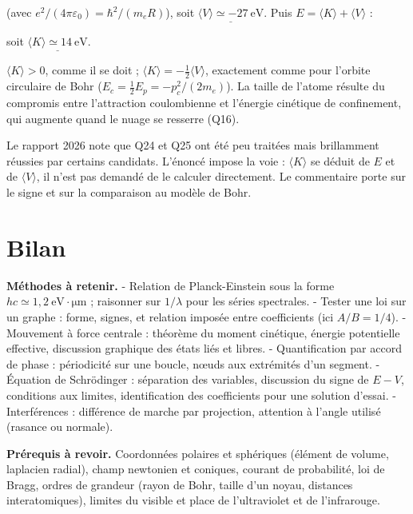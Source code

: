 \documentclass[11pt,a4paper]{article}
\newcommand{\equationajustee}[1]{%
  \sbox{\boiteequation}{$\displaystyle #1$}%
  \ifdim\wd\boiteequation>\linewidth
    \[\resizebox{\linewidth}{!}{\usebox{\boiteequation}}\]%
  \else
    \[#1\]%
  \fi}
\begin{document}
\equationajustee{\boxed{\langle V\rangle=-\frac{e^2}{4\pi\varepsilon_0R}=2E}}

(avec \(e^2/(4\pi\varepsilon_0)=\hbar^2/(m_eR)\)), soit \(\underline{\langle V\rangle\simeq-27\ \mathrm{eV}}\). Puis \(E=\langle K\rangle+\langle V\rangle\) :

\equationajustee{\boxed{\langle K\rangle=-E=E_0}}

soit \(\underline{\langle K\rangle\simeq14\ \mathrm{eV}}\).

\(\langle K\rangle>0\), comme il se doit ; \(\langle K\rangle=-\frac12\langle V\rangle\), exactement comme pour l'orbite circulaire de Bohr (\(E_c=\frac12E_p=-p_c^2/(2m_e)\)). La taille de l'atome résulte du compromis entre l'attraction coulombienne et l'énergie cinétique de confinement, qui augmente quand le nuage se resserre (Q16).

\begin{jury}

Le rapport 2026 note que Q24 et Q25 ont été peu traitées mais brillamment réussies par certains candidats. L'énoncé impose la voie : \(\langle K\rangle\) se déduit de \(E\) et de \(\langle V\rangle\), il n'est pas demandé de le calculer directement. Le commentaire porte sur le signe et sur la comparaison au modèle de Bohr.

\end{jury}

\hypertarget{bilan}{%
\section{Bilan}\label{bilan}}

\textbf{Méthodes à retenir.}
- Relation de Planck-Einstein sous la forme \(hc\simeq1{,}2\ \mathrm{eV\cdot\mu m}\) ; raisonner sur \(1/\lambda\) pour les séries spectrales.
- Tester une loi sur un graphe : forme, signes, et relation imposée entre coefficients (ici \(A/B=1/4\)).
- Mouvement à force centrale : théorème du moment cinétique, énergie potentielle effective, discussion graphique des états liés et libres.
- Quantification par accord de phase : périodicité sur une boucle, nœuds aux extrémités d'un segment.
- Équation de Schrödinger : séparation des variables, discussion du signe de \(E-V\), conditions aux limites, identification des coefficients pour une solution d'essai.
- Interférences : différence de marche par projection, attention à l'angle utilisé (rasance ou normale).

\textbf{Prérequis à revoir.} Coordonnées polaires et sphériques (élément de volume, laplacien radial), champ newtonien et coniques, courant de probabilité, loi de Bragg, ordres de grandeur (rayon de Bohr, taille d'un noyau, distances interatomiques), limites du visible et place de l'ultraviolet et de l'infrarouge.
\end{document}
